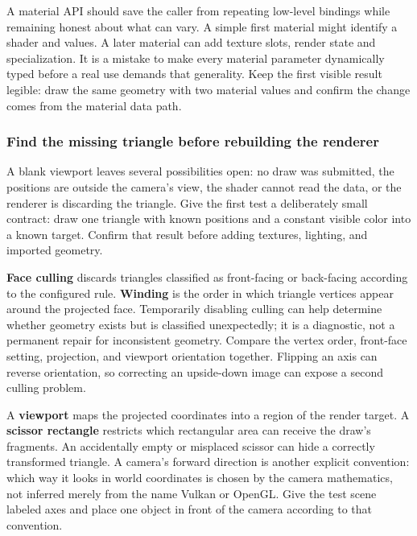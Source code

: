 A material API should save the caller from repeating low-level bindings while remaining honest about what can vary. A simple first material might identify a shader and values. A later material can add texture slots, render state and specialization. It is a mistake to make every material parameter dynamically typed before a real use demands that generality. Keep the first visible result legible: draw the same geometry with two material values and confirm the change comes from the material data path.

\subsubsection{Find the missing triangle before rebuilding the renderer}\label{06-engine-ii-ch026-find-the-missing-triangle-before-rebuilding-the-renderer}

\hypertarget{06-engine-ii-ch026-find-the-missing-triangle-before-rebuilding-the-renderer}{}

A blank viewport leaves several possibilities open: no draw was submitted, the positions are outside the camera's view, the shader cannot read the data, or the renderer is discarding the triangle. Give the first test a deliberately small contract: draw one triangle with known positions and a constant visible color into a known target. Confirm that result before adding textures, lighting, and imported geometry.

\textbf{Face culling} discards triangles classified as front-facing or back-facing according to the configured rule. \textbf{Winding} is the order in which triangle vertices appear around the projected face. Temporarily disabling culling can help determine whether geometry exists but is classified unexpectedly; it is a diagnostic, not a permanent repair for inconsistent geometry. Compare the vertex order, front-face setting, projection, and viewport orientation together. Flipping an axis can reverse orientation, so correcting an upside-down image can expose a second culling problem.

A \textbf{viewport} maps the projected coordinates into a region of the render target. A \textbf{scissor rectangle} restricts which rectangular area can receive the draw's fragments. An accidentally empty or misplaced scissor can hide a correctly transformed triangle. A camera's forward direction is another explicit convention: which way it looks in world coordinates is chosen by the camera mathematics, not inferred merely from the name Vulkan or OpenGL. Give the test scene labeled axes and place one object in front of the camera according to that convention.

